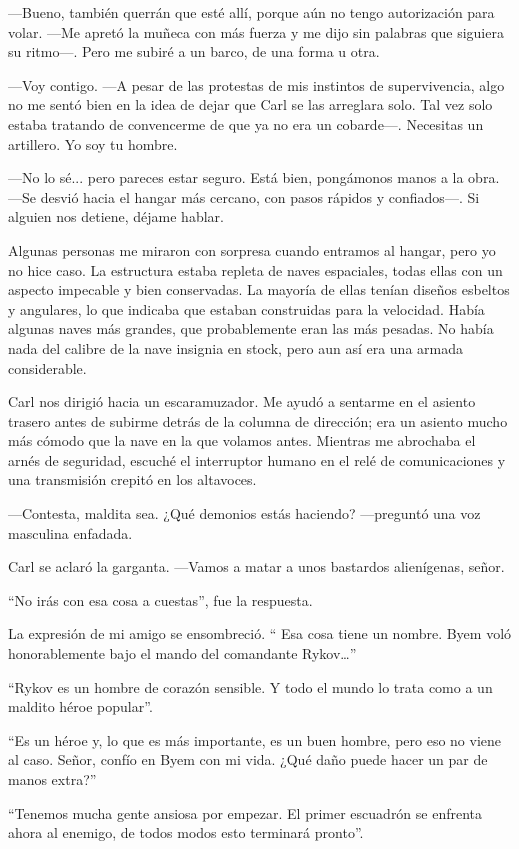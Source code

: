 —Bueno, también querrán que esté allí, porque aún no tengo autorización para volar. —Me apretó la muñeca con más fuerza y me dijo sin palabras que siguiera su ritmo—. Pero me subiré a un barco, de una forma u otra.

—Voy contigo. —A pesar de las protestas de mis instintos de supervivencia, algo no me sentó bien en la idea de dejar que Carl se las arreglara solo. Tal vez solo estaba tratando de convencerme de que ya no era un cobarde—. Necesitas un artillero. Yo soy tu hombre.

—No lo sé... pero pareces estar seguro. Está bien, pongámonos manos a la obra. —Se desvió hacia el hangar más cercano, con pasos rápidos y confiados—. Si alguien nos detiene, déjame hablar.

Algunas personas me miraron con sorpresa cuando entramos al hangar, pero yo no hice caso. La estructura estaba repleta de naves espaciales, todas ellas con un aspecto impecable y bien conservadas. La mayoría de ellas tenían diseños esbeltos y angulares, lo que indicaba que estaban construidas para la velocidad. Había algunas naves más grandes, que probablemente eran las más pesadas. No había nada del calibre de la nave insignia en stock, pero aun así era una armada considerable.

Carl nos dirigió hacia un escaramuzador. Me ayudó a sentarme en el asiento trasero antes de subirme detrás de la columna de dirección; era un asiento mucho más cómodo que la nave en la que volamos antes. Mientras me abrochaba el arnés de seguridad, escuché el interruptor humano en el relé de comunicaciones y una transmisión crepitó en los altavoces.

—Contesta, maldita sea. ¿Qué demonios estás haciendo? —preguntó una voz masculina enfadada.

Carl se aclaró la garganta. —Vamos a matar a unos bastardos alienígenas, señor.

``No irás con esa cosa a cuestas'', fue la respuesta.

La expresión de mi amigo se ensombreció. `` Esa cosa tiene un nombre. Byem voló honorablemente bajo el mando del comandante Rykov…''

``Rykov es un hombre de corazón sensible. Y todo el mundo lo trata como a un maldito héroe popular''.

``Es un héroe y, lo que es más importante, es un buen hombre, pero eso no viene al caso. Señor, confío en Byem con mi vida. ¿Qué daño puede hacer un par de manos extra?''

``Tenemos mucha gente ansiosa por empezar. El primer escuadrón se enfrenta ahora al enemigo, de todos modos esto terminará pronto''.


